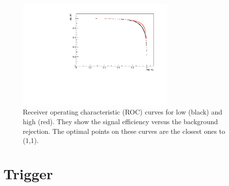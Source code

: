 \begin{figure}
\centering
\includegraphics[width=0.7\textwidth]{Lmumu/figs/ROC.pdf}
\caption{Receiver operating characteristic (ROC) curves for low \qsq (black) and high \qsq (red).
They show the signal efficiency versus the background rejection.
The optimal points on these curves are the closest ones to (1,1). }
\label{fig:Lb_ROC}
\end{figure}

%
%




\section{Trigger}

